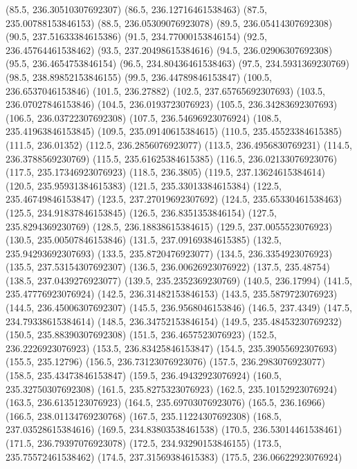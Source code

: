 {{{		(85.5, 236.30510307692307)
		(86.5, 236.12716461538463)
		(87.5, 235.00788153846153)
		(88.5, 236.05309076923078)
		(89.5, 236.05414307692308)
		(90.5, 237.51633384615386)
		(91.5, 234.77000153846154)
		(92.5, 236.45764461538462)
		(93.5, 237.20498615384616)
		(94.5, 236.02906307692308)
		(95.5, 236.4654753846154)
		(96.5, 234.80436461538463)
		(97.5, 234.5931369230769)
		(98.5, 238.89852153846155)
		(99.5, 236.44789846153847)
		(100.5, 236.6537046153846)
		(101.5, 236.27882)
		(102.5, 237.65765692307693)
		(103.5, 236.07027846153846)
		(104.5, 236.0193723076923)
		(105.5, 236.34283692307693)
		(106.5, 236.03722307692308)
		(107.5, 236.54696923076924)
		(108.5, 235.41963846153845)
		(109.5, 235.09140615384615)
		(110.5, 235.45523384615385)
		(111.5, 236.01352)
		(112.5, 236.2856076923077)
		(113.5, 236.4956830769231)
		(114.5, 236.3788569230769)
		(115.5, 235.61625384615385)
		(116.5, 236.02133076923076)
		(117.5, 235.17346923076923)
		(118.5, 236.3805)
		(119.5, 237.13624615384614)
		(120.5, 235.95931384615383)
		(121.5, 235.33013384615384)
		(122.5, 235.46749846153847)
		(123.5, 237.27019692307692)
		(124.5, 235.65330461538463)
		(125.5, 234.91837846153845)
		(126.5, 236.8351353846154)
		(127.5, 235.8294369230769)
		(128.5, 236.18838615384615)
		(129.5, 237.0055523076923)
		(130.5, 235.00507846153846)
		(131.5, 237.09169384615385)
		(132.5, 235.94293692307693)
		(133.5, 235.8720476923077)
		(134.5, 236.3354923076923)
		(135.5, 237.53154307692307)
		(136.5, 236.00626923076922)
		(137.5, 235.48754)
		(138.5, 237.0439276923077)
		(139.5, 235.2352369230769)
		(140.5, 236.17994)
		(141.5, 235.47776923076924)
		(142.5, 236.31482153846153)
		(143.5, 235.5879723076923)
		(144.5, 236.45006307692307)
		(145.5, 236.9568046153846)
		(146.5, 237.4349)
		(147.5, 234.79338615384614)
		(148.5, 236.34752153846154)
		(149.5, 235.48453230769232)
		(150.5, 235.88390307692308)
		(151.5, 236.4657523076923)
		(152.5, 236.2226923076923)
		(153.5, 236.83425846153847)
		(154.5, 235.39055692307693)
		(155.5, 235.12796)
		(156.5, 236.73123076923076)
		(157.5, 236.2983076923077)
		(158.5, 235.43473846153847)
		(159.5, 236.49432923076924)
		(160.5, 235.32750307692308)
		(161.5, 235.8275323076923)
		(162.5, 235.10152923076924)
		(163.5, 236.6135123076923)
		(164.5, 235.69703076923076)
		(165.5, 236.16966)
		(166.5, 238.01134769230768)
		(167.5, 235.11224307692308)
		(168.5, 237.03528615384616)
		(169.5, 234.83803538461538)
		(170.5, 236.53014461538461)
		(171.5, 236.79397076923078)
		(172.5, 234.93290153846155)
		(173.5, 235.75572461538462)
		(174.5, 237.31569384615383)
		(175.5, 236.06622923076924)
}}}

